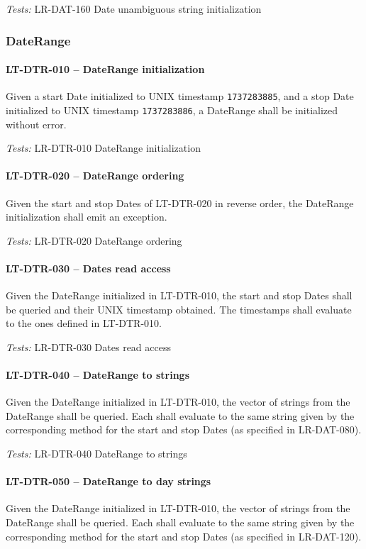 \textit{Tests: } LR-DAT-160 Date unambiguous string initialization

\subsubsection{DateRange}
\paragraph{LT-DTR-010 -- DateRange initialization}
Given a start Date initialized to UNIX timestamp \lstinline{1737283885},
and a stop Date initialized to UNIX timestamp \lstinline{1737283886},
a DateRange shall be initialized without error.

\textit{Tests: } LR-DTR-010 DateRange initialization

\paragraph{LT-DTR-020 -- DateRange ordering}
Given the start and stop Dates of LT-DTR-020 in reverse order,
the DateRange initialization shall emit an exception.

\textit{Tests: } LR-DTR-020 DateRange ordering

\paragraph{LT-DTR-030 -- Dates read access}
Given the DateRange initialized in LT-DTR-010, the start and stop
Dates shall be queried and their UNIX timestamp obtained.
The timestamps shall evaluate to the ones defined in LT-DTR-010.

\textit{Tests: } LR-DTR-030 Dates read access

\paragraph{LT-DTR-040 -- DateRange to strings}
Given the DateRange initialized in LT-DTR-010, the vector of
strings from the DateRange shall be queried. Each shall evaluate
to the same string given by the corresponding method for the start and stop
Dates (as specified in LR-DAT-080).

\textit{Tests: } LR-DTR-040 DateRange to strings

\paragraph{LT-DTR-050 -- DateRange to day strings}
Given the DateRange initialized in LT-DTR-010, the vector of
strings from the DateRange shall be queried. Each shall evaluate
to the same string given by the corresponding method for the start and stop
Dates (as specified in LR-DAT-120).

